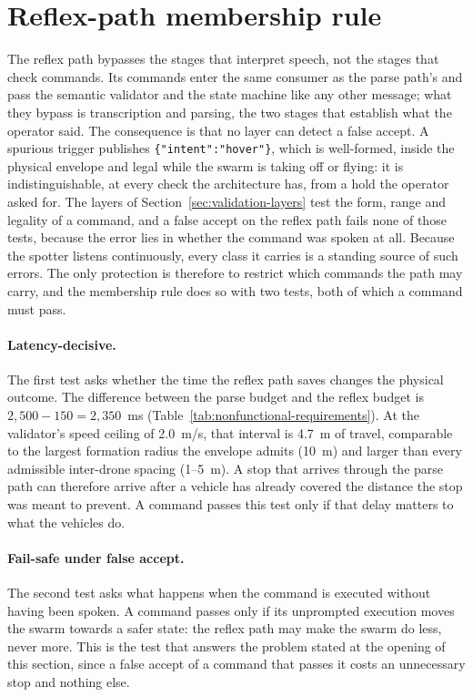 \section{Reflex-path membership rule}
\label{sec:membership-rule}
The reflex path bypasses the stages that interpret speech, not the stages that check commands. Its
commands enter the same consumer as the parse path's and pass the semantic validator and the state
machine like any other message; what they bypass is transcription and parsing, the two stages that
establish what the operator said. The consequence is that no layer can detect a false accept. A
spurious trigger publishes \texttt{\{"intent":"hover"\}}, which is well-formed, inside the physical
envelope and legal while the swarm is taking off or flying: it is indistinguishable, at every check
the architecture has, from a hold the operator asked for. The layers of
Section~\ref{sec:validation-layers} test the form, range and legality of a command, and a false
accept on the reflex path fails none of those tests, because the error lies in whether the command
was spoken at all. Because the spotter listens continuously, every class it carries is a standing
source of such errors. The only protection is therefore to restrict which commands the path may
carry, and the membership rule does so with two tests, both of which a command must pass.

\paragraph{Latency-decisive.} The first test asks whether the time the reflex path saves changes the
physical outcome. The difference between the parse budget and the reflex budget is $2{,}500 - 150 =
2{,}350$~ms (Table~\ref{tab:nonfunctional-requirements}). At the validator's speed ceiling of
2.0~m/s, that interval is 4.7~m of travel, comparable to the largest formation radius the envelope
admits (10~m) and larger than every admissible inter-drone spacing (1--5~m). A stop that arrives
through the parse path can therefore arrive after a vehicle has already covered the distance the
stop was meant to prevent. A command passes this test only if that delay matters to what the
vehicles do.

\paragraph{Fail-safe under false accept.} The second test asks what happens when the command is
executed without having been spoken. A command passes only if its unprompted execution moves the
swarm towards a safer state: the reflex path may make the swarm do less, never more. This is the
test that answers the problem stated at the opening of this section, since a false accept of a command that
passes it costs an unnecessary stop and nothing else.

